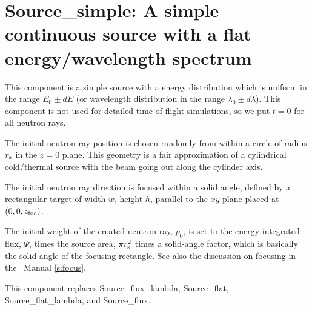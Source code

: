 \section{Source\_simple: A simple continuous source
with a flat energy/wavelength spectrum}
\label{source-simple}


This component is
a simple source with a energy distribution which is uniform
in the range $E_0 \pm dE$
(or wavelength distribution in the range $\lambda_0 \pm d\lambda$).
This component is not used for detailed time-of-flight simulations,
so we put $t=0$ for all neutron rays.

The initial neutron ray position is chosen randomly from within a
circle of radius $r_{\rm s}$ in the $z=0$ plane.
This geometry is a fair approximation
of a cylindrical cold/thermal source with the beam going out along
the cylinder axis.

The initial neutron ray direction is focused within
a solid angle, defined by a rectangular target of width
$w$, height $h$, parallel to
the $xy$ plane placed at $(0,0,z_{\rm foc})$.

The initial weight of the created neutron ray, $p_0$, is set to the
energy-integrated flux, $\Psi$, times the source area, $\pi r_{\rm s}^2$
times a solid-angle factor, which is basically the
solid angle of the focusing rectangle.
See also the discussion on focusing in the \MCS\ Manual \ref{s:focus}.

This component replaces Source\_flux\_lambda, Source\_flat, Source\_flat\_lambda, and
Source\_flux.

